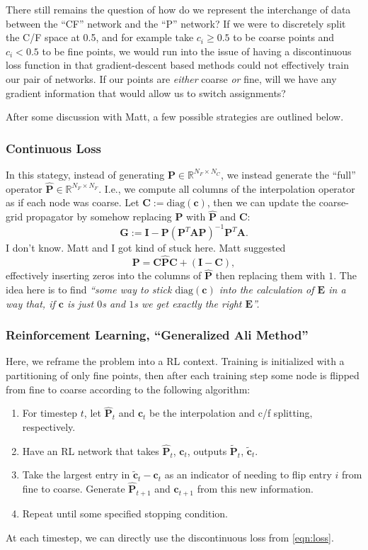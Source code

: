 \documentclass{article}
\newcommand{\mat}[1]{\bm{{#1}}}
\renewcommand{\vec}[1]{\bm{{#1}}}
\begin{document}
There still remains the question of how do we represent the interchange of data between the ``CF'' network and the ``P'' network?  If we were to discretely split the C/F space at 0.5, and for example take $c_i\geq 0.5$ to be coarse points and $c_i<0.5$ to be fine points, we would run into the issue of having a discontinuous loss function in that gradient-descent based methods could not effectively train our pair of networks.   If our points are \textit{either} coarse \textit{or} fine, will we have any gradient information that would allow us to switch assignments?

After some discussion with Matt, a few possible strategies are outlined below.
\subsubsection{Continuous Loss}
In this stategy, instead of generating $\mat{P} \in \mathbb{R}^{N_F\times N_C}$, we instead generate the ``full'' operator $\hat{\mat{P}} \in \mathbb{R}^{N_F \times N_F}$.  I.e., we compute all columns of the interpolation operator as if each node was coarse.  Let $\mat{C} := \text{diag}\left(\vec{c}\right)$, then we can update the coarse-grid propagator by somehow replacing $\mat{P}$ with $\hat{\mat{P}}$ and $\mat{C}$:
\begin{equation}
  \mat{G} := \mat{I} - \mat{P} \left( \mat{P}^T \mat{A} \mat{P} \right)^{-1} \mat{P}^T \mat{A}.
\end{equation}
I don't know.  Matt and I got kind of stuck here.  Matt suggested
\begin{equation}
  \mat{P} = \mat{C} \hat{\mat{P}} \mat{C} + \left(\mat{I} - \mat{C}\right),
\end{equation}
effectively inserting zeros into the columns of $\hat{\mat{P}}$ then replacing them with $1$.  The idea here is to find \textit{``some way to stick $\text{diag}\left(\vec{c}\right)$ into the calculation of $\mat{E}$ in a way that, if $\vec{c}$ is just $0$s and $1$s we get exactly the right $\mat{E}$''.}
\subsubsection{Reinforcement Learning, ``Generalized Ali Method''}
Here, we reframe the problem into a RL context.  Training is initialized with a partitioning of only fine points, then after each training step some node is flipped from fine to coarse according to the following algorithm:
\begin{enumerate}
\item For timestep $t$, let $\hat{\mat{P}}_t$ and $\mat{c}_t$ be the interpolation and c/f splitting, respectively.
\item Have an RL network that takes $\hat{\mat{P}}_t$, $\mat{c}_t$, outputs $\widetilde{\mat{P}}_t$, $\widetilde{\mat{c}}_t$.
\item Take the largest entry in $\widetilde{\vec{c}}_t - \vec{c}_t$ as an indicator of needing to flip entry $i$ from fine to coarse.  Generate $\hat{\mat{P}}_{t+1}$ and $\mat{c}_{t+1}$ from this new information.
\item Repeat until some specified stopping condition.
\end{enumerate}
At each timestep, we can directly use the discontinuous loss from \eqref{eqn:loss}.
\end{document}
